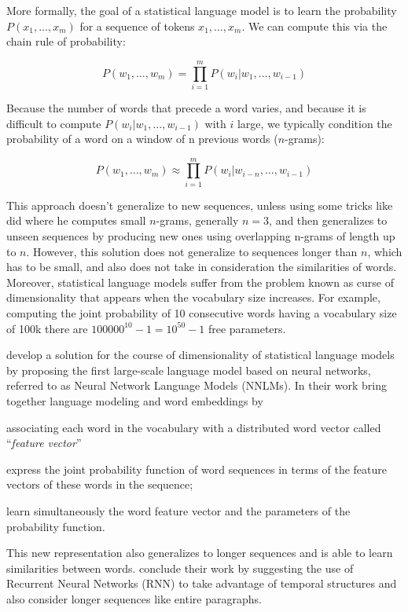 More formally, the goal of a statistical language model is to learn the probability $P(x_1, \dots, x_m)$ for a sequence of tokens $x_1, \dots, x_m$. We can compute this via the chain rule of probability:

\begin{equation}
P\left(w_{1}, \ldots, w_{m}\right)=\prod_{i=1}^{m} P\left(w_{i} | w_{1}, \dots, w_{i-1}\right)
\end{equation}

Because the number of words that precede a word varies, and because it is difficult to compute $P(w_i | w_1,\dots, w_{i-1})$ with $i$ large, we typically condition the probability of a word on a window of n previous words ($n$-grams): 


\begin{equation}
P\left(w_{1}, \ldots, w_{m}\right) \approx \prod_{i=1}^{m} P\left(w_{i} | w_{i-n}, \dots, w_{i-1}\right)
\end{equation}

This approach doesn't generalize to new sequences, unless using some tricks like~\citet{katz1987probablm} did where he computes small $n$-grams, generally $n=3$, and then generalizes to unseen sequences by producing new ones using overlapping n-grams of length up to $n$. However, this solution does not generalize to sequences longer than $n$, which has to be small, and also does not take in consideration the similarities of words. Moreover, statistical language models suffer from the problem known as curse of dimensionality that appears when the vocabulary size increases. For example, computing the joint probability of 10 consecutive words having a vocabulary size of 100k there are $100000^{10} - 1 = 10^{50} - 1$ free parameters. 

\citet{bengio2003nnlm} develop a solution for the course of dimensionality of statistical language models by proposing the first large-scale language model based on neural networks, referred to as Neural Network Language Models (NNLMs). In their work \citet{bengio2003nnlm} bring together language modeling and word embeddings by \begin {enumerate*} [1) ]%
\item associating each word in the vocabulary with a distributed word vector called ``\textit{feature vector}'' \item express the joint probability function of word sequences in terms of the feature vectors of these words in the sequence; \item learn simultaneously the word feature vector and the parameters of the probability function.
\end {enumerate*} This new representation also generalizes to longer sequences and is able to learn similarities between words. \citet{bengio2003nnlm} conclude their work by suggesting the use of Recurrent Neural Networks (RNN) to take advantage of temporal structures and also consider longer sequences like entire paragraphs.

